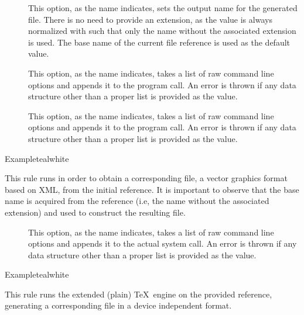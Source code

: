 \begin{description}
\begin{description}
\item[] This option, as the name indicates, sets the output name for the generated  file. There is no need to provide an extension, as the value is always normalized with  such that only the name without the associated extension is used. The base name of the current file reference is used as the default value.

\item[] This option, as the name indicates, takes a list of raw command line options and appends it to the  program call. An error is thrown if any data structure other than a proper list is provided as the value.

\item[] This option, as the name indicates, takes a list of raw command line options and appends it to the  program call. An error is thrown if any data structure other than a proper list is provided as the value.
\end{description}

\begin{codebox}{Example}{teal}{\icnote}{white}
\end{codebox}

\item[\rulebox{dvisvgm}]
This rule runs  in order to obtain a corresponding  file, a vector graphics format based on XML, from the initial  reference. It is important to observe that the base name is acquired from the  reference (i.e, the name without the associated extension) and used to construct the resulting file.

\begin{description}
\item[] This option, as the name indicates, takes a list of raw command line options and appends it to the actual system call. An error is thrown if any data structure other than a proper list is provided as the value.
\end{description}

\begin{codebox}{Example}{teal}{\icnote}{white}
\end{codebox}

\item[\rulebox{etex}]
This rule runs the  extended (plain) \TeX\ engine on the provided  reference, generating a corresponding file in a device independent format.


\end{description}
